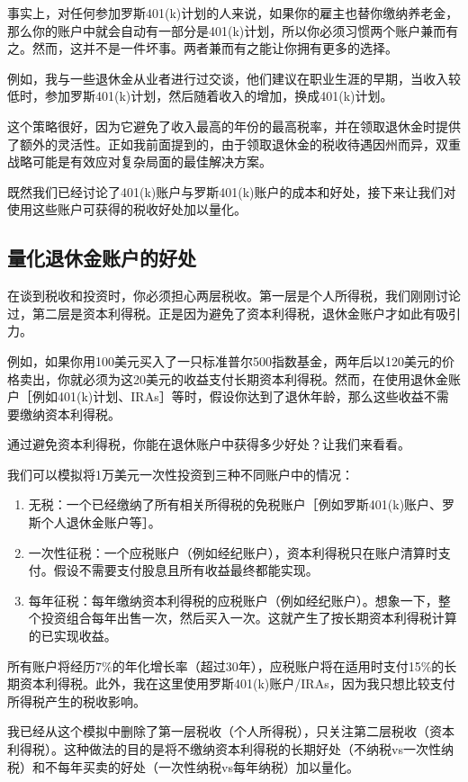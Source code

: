 事实上，对任何参加罗斯401(k)计划的人来说，如果你的雇主也替你缴纳养老金，那么你的账户中就会自动有一部分是401(k)计划，所以你必须习惯两个账户兼而有之。然而，这并不是一件坏事。两者兼而有之能让你拥有更多的选择。

例如，我与一些退休金从业者进行过交谈，他们建议在职业生涯的早期，当收入较低时，参加罗斯401(k)计划，然后随着收入的增加，换成401(k)计划。

这个策略很好，因为它避免了收入最高的年份的最高税率，并在领取退休金时提供了额外的灵活性。正如我前面提到的，由于领取退休金的税收待遇因州而异，双重战略可能是有效应对复杂局面的最佳解决方案。

既然我们已经讨论了401(k)账户与罗斯401(k)账户的成本和好处，接下来让我们对使用这些账户可获得的税收好处加以量化。

\subsection{量化退休金账户的好处}

在谈到税收和投资时，你必须担心两层税收。第一层是个人所得税，我们刚刚讨论过，第二层是资本利得税。正是因为避免了资本利得税，退休金账户才如此有吸引力。

例如，如果你用100美元买入了一只标准普尔500指数基金，两年后以120美元的价格卖出，你就必须为这20美元的收益支付长期资本利得税。然而，在使用退休金账户［例如401(k)计划、IRAs］等时，假设你达到了退休年龄，那么这些收益不需要缴纳资本利得税。

通过避免资本利得税，你能在退休账户中获得多少好处？让我们来看看。

我们可以模拟将1万美元一次性投资到三种不同账户中的情况：

\begin{enumerate}
\item 无税：一个已经缴纳了所有相关所得税的免税账户［例如罗斯401(k)账户、罗斯个人退休金账户等］。
\item 一次性征税：一个应税账户（例如经纪账户），资本利得税只在账户清算时支付。假设不需要支付股息且所有收益最终都能实现。
\item 每年征税：每年缴纳资本利得税的应税账户（例如经纪账户）。想象一下，整个投资组合每年出售一次，然后买入一次。这就产生了按长期资本利得税计算的已实现收益。
\end{enumerate}

所有账户将经历7\%的年化增长率（超过30年），应税账户将在适用时支付15\%的长期资本利得税。此外，我在这里使用罗斯401(k)账户/IRAs，因为我只想比较支付所得税产生的税收影响。

我已经从这个模拟中删除了第一层税收（个人所得税），只关注第二层税收（资本利得税）。这种做法的目的是将不缴纳资本利得税的长期好处（不纳税vs一次性纳税）和不每年买卖的好处（一次性纳税vs每年纳税）加以量化。

